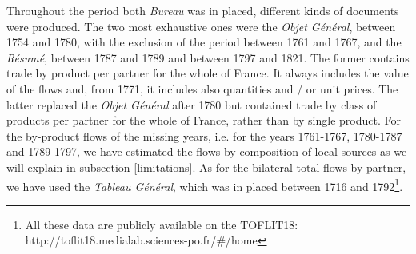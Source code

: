 \documentclass[12pt,a4paper,notitlepage,english]{article}
\begin{document}
Throughout the period both \textit{Bureau} was in placed, different kinds of documents were produced. The two most exhaustive ones were the \textit{Objet Général}, between 1754 and 1780, with the exclusion of the period between 1761 and 1767, and the \textit{Résumé}, between 1787 and 1789 and between 1797 and 1821. The former contains trade by product per partner for the whole of France. It always includes the value of the flows and, from 1771, it includes also quantities and / or unit prices. The latter replaced the \textit{Objet Général} after 1780 but contained trade by class of products per partner for the whole of France, rather than by single product. For the by-product flows of the missing years, i.e. for the years 1761-1767, 1780-1787 and 1789-1797, we have estimated the flows by composition of local sources as we will explain in subsection \ref{limitations}. As for the bilateral total flows by partner, we have used the \textit{Tableau Général}, which was in placed between 1716 and 1792\footnote{All these data are publicly available on the TOFLIT18: http://toflit18.medialab.sciences-po.fr/\#/home }.
\end{document}
